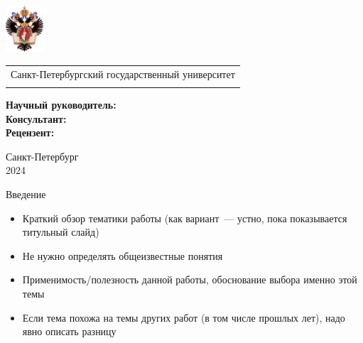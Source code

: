 \documentclass{beamer}
\title[Короткое название]{\my@title@title@ru}
\author[\my@title@author@ru]{\my@title@author@ru, группа \academicGroup}
\institute[СПбГУ]{}
\makeatletter
\newcommand{\advisorChair}{\my@title@chair@ru}
\newcommand{\supervisor}{\my@title@supervisor@ru}
\newcommand{\supervisorPosition}{\my@title@supervisorPosition@ru}
\newcommand{\consultant}{\my@title@consultant@ru}
\newcommand{\consultantPosition}{\my@title@consultantPosition@ru}
\newcommand{\reviewer}{\my@title@reviewer@ru}
\newcommand{\reviewerPosition}{\my@title@reviewerPosition@ru}
\makeatother
\begin{document}
{
\begin{frame}
  \includegraphics[width=1.4cm]{pictures/SPbGU_Logo.png}
\vspace{-35pt}
\hspace{-10pt}
\begin{center}
   \begin{tabular}{c}
        \scriptsize{Санкт-Петербургский государственный университет} \\
        \scriptsize{\advisorChair}
    \end{tabular}
\titlepage
\end{center}

\btVFill


{\scriptsize
  \textbf{Научный руководитель:}  \supervisorPosition ~\supervisor \\
  \textbf{Консультант:}  \consultantPosition ~\consultant \\
  \textbf{Рецензент:} \reviewerPosition ~\reviewer \\
}
\makeatother
\begin{center}
  \vspace{5pt}
  \scriptsize{Санкт-Петербург\\
                 2024}
  \end{center}
\end{frame}
}

\begin{frame}{Введение}
  \begin{itemize}
    \item Краткий обзор тематики работы (как вариант~--- устно, пока показывается титульный слайд)
    \item Не нужно определять общеизвестные понятия
    \item Применимость/полезность данной работы, обоснование выбора именно этой темы
    \item Если тема похожа на темы других работ (в том числе прошлых лет), надо явно описать разницу
  \end{itemize}
\end{frame}
\end{document}
